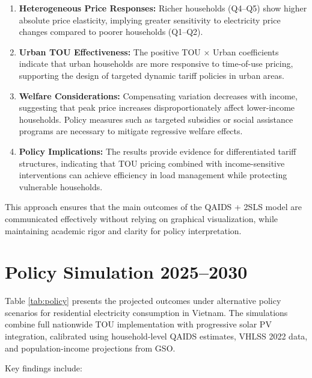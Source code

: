 \documentclass[12pt,a4paper]{article}
\begin{document}
	\begin{enumerate}
		\item \textbf{Heterogeneous Price Responses:} Richer households (Q4–Q5) show higher absolute price elasticity, implying greater sensitivity to electricity price changes compared to poorer households (Q1–Q2). 
		\item \textbf{Urban TOU Effectiveness:} The positive TOU × Urban coefficients indicate that urban households are more responsive to time-of-use pricing, supporting the design of targeted dynamic tariff policies in urban areas.
		\item \textbf{Welfare Considerations:} Compensating variation decreases with income, suggesting that peak price increases disproportionately affect lower-income households. Policy measures such as targeted subsidies or social assistance programs are necessary to mitigate regressive welfare effects.
		\item \textbf{Policy Implications:} The results provide evidence for differentiated tariff structures, indicating that TOU pricing combined with income-sensitive interventions can achieve efficiency in load management while protecting vulnerable households.
	\end{enumerate}
	
	This approach ensures that the main outcomes of the QAIDS + 2SLS model are communicated effectively without relying on graphical visualization, while maintaining academic rigor and clarity for policy interpretation.
		
	\section{Policy Simulation 2025--2030}
	
	Table \ref{tab:policy} presents the projected outcomes under alternative policy scenarios for residential electricity consumption in Vietnam. The simulations combine full nationwide TOU implementation with progressive solar PV integration, calibrated using household-level QAIDS estimates, VHLSS 2022 data, and population-income projections from GSO.  
	
	Key findings include:
	
\end{document}
